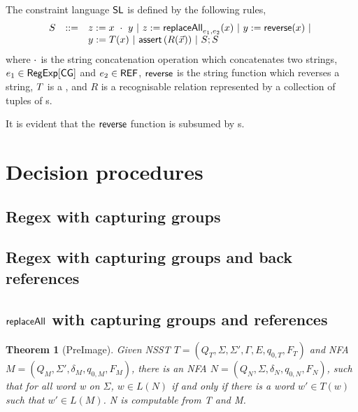 \documentclass[sigplan,review,anonymous]{acmart}\settopmatter{printfolios=true,printccs=false,printacmref=false}
\newtheorem{definition}{Definition}
\newtheorem{theorem}{Theorem}
\begin{document}



The constraint language $\mathsf{SL}$ is defined by the following rules,
\[
\begin{array}{l c l}
S &::= &  z:= x\ \cdot\ y \ |\ z := \mathsf{replaceAll}_{e_1, e_2}(x) \ | \  y := \mathsf{reverse}(x) \ |\ \\
& &  y := T(x)\ |\  \text{$\textsf{assert}\left(R(\vec{x})\right)$}\ |\ S; S\
\label{eq:SL}
\end{array}
\]
where $\cdot$ is the string concatenation operation which concatenates two strings, $e_1 \in {\sf RegExp}[\sf CG]$ and $e_2 \in {\sf REF}$, %
$\mathsf{reverse}$ is the string function which reverses a string, $T$ is a \NSST{},  and $R$ is a recognisable relation represented by a collection of tuples of \FA{}s.


It is evident that the $\mathsf{reverse}$ function is subsumed by \NSST{}s.


\section{Decision procedures}


\subsection{Regex with capturing groups}

\subsection{Regex with capturing groups and back references}

\subsection{$\mathsf{replaceAll}$ with capturing groups and references}


\begin{theorem}[PreImage]
  Given NSST $T = (Q_T, \Sigma, \Sigma', \Gamma, E, q_{0, T}, F_T)$ and NFA $M
  = (Q_M, \Sigma', \delta_M, q_{0, M}, F_M)$, there is an NFA $N = (Q_N,
  \Sigma, \delta_N, q_{0, N}, F_N)$, such that for all word w on $\Sigma$, $w
  \in L (N)$ if and only if there is a word $w' \in T (w)$ such that $w' \in L
  (M)$. N is computable from T and M.
\end{theorem}
\end{document}
